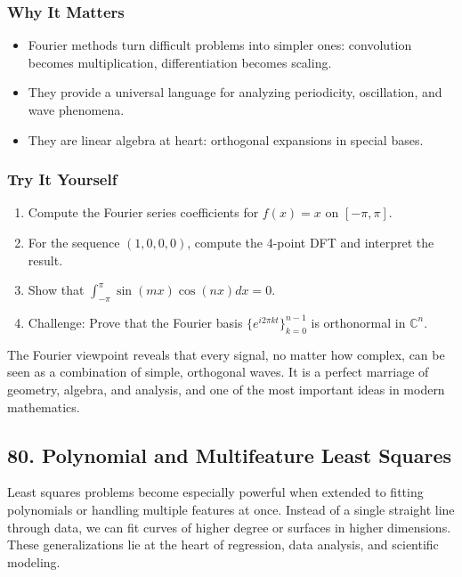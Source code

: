 \documentclass[
  letterpaper,
  DIV=11,
  numbers=noendperiod]{scrreprt}
\providecommand{\tightlist}{%
  \setlength{\itemsep}{0pt}\setlength{\parskip}{0pt}}
\begin{document}
\subsubsection{Why It Matters}\label{why-it-matters-75}

\begin{itemize}
\tightlist
\item
  Fourier methods turn difficult problems into simpler ones: convolution
  becomes multiplication, differentiation becomes scaling.
\item
  They provide a universal language for analyzing periodicity,
  oscillation, and wave phenomena.
\item
  They are linear algebra at heart: orthogonal expansions in special
  bases.
\end{itemize}

\subsubsection{Try It Yourself}\label{try-it-yourself-78}

\begin{enumerate}
\def\labelenumi{\arabic{enumi}.}
\tightlist
\item
  Compute the Fourier series coefficients for \(f(x) = x\) on
  \([-\pi,\pi]\).
\item
  For the sequence \((1,0,0,0)\), compute the 4-point DFT and interpret
  the result.
\item
  Show that \(\int_{-\pi}^\pi \sin(mx)\cos(nx) dx = 0\).
\item
  Challenge: Prove that the Fourier basis
  \(\{e^{i2\pi k t}\}_{k=0}^{n-1}\) is orthonormal in \(\mathbb{C}^n\).
\end{enumerate}

The Fourier viewpoint reveals that every signal, no matter how complex,
can be seen as a combination of simple, orthogonal waves. It is a
perfect marriage of geometry, algebra, and analysis, and one of the most
important ideas in modern mathematics.

\subsection{80. Polynomial and Multifeature Least
Squares}\label{polynomial-and-multifeature-least-squares}

Least squares problems become especially powerful when extended to
fitting polynomials or handling multiple features at once. Instead of a
single straight line through data, we can fit curves of higher degree or
surfaces in higher dimensions. These generalizations lie at the heart of
regression, data analysis, and scientific modeling.
\end{document}
